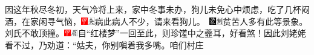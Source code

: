 因这年秋尽冬初，天气冷将上来，家中冬事未办，狗儿未免心中烦虑，吃了几杯闷酒，在家闲寻气恼，{{\includegraphics[width=3mm]{../Images/00002}\includegraphics[width=3mm]{../Images/00012}\footnotesize \kaishu 病此病人不少，请来看狗儿。　}\includegraphics[width=3mm]{../Images/00006}\includegraphics[width=3mm]{../Images/00011}\footnotesize \kaishu 贫苦人多有此等景象。}刘氏不敢顶撞。{\includegraphics[width=3mm]{../Images/00002}\includegraphics[width=3mm]{../Images/00010}\footnotesize \kaishu 自“红楼梦”一回至此，则珍馐中之虀耳，好看煞！}因此刘姥姥看不过，乃劝道：“姑夫，你别嗔着我多嘴。咱们村庄